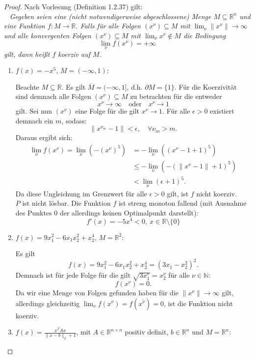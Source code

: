 \documentclass[12pt]{extreport} %
\newcommand{\N}{\mathbb{N}}
\newcommand{\R}{\mathbb{R}}
\theoremstyle{named}
\theoremstyle{nnamed}
\theoremstyle{itshape}
\theoremstyle{normal}
\begin{document}
\begin{proof} Nach Vorlesung (Definition 1.2.37) gilt: ~\\ ~\medskip
	\textit{Gegeben seien eine (nicht notwendigerweise abgeschlossene) Menge $M \subseteq \R^n$ und eine Funktion $f \colon M \rightarrow \R$. Falls für alle Folgen $(x^\nu) \subseteq M$ mit $\lim_{\nu} \| x^\nu \| \rightarrow \infty$ und alle konvergenten Folgen $(x^\nu) \subseteq M$ mit $\lim_{\nu} x^\nu \notin M$ die Bedingung}
	$$ \lim_{\nu} f(x^\nu) = + \infty $$
	\textit{gilt, dann heißt $f$ koerziv auf $M$.} ~\\
	
	\begin{enumerate} %
		\item $f(x) = - x^5$, $M =(- \infty, 1)$: ~\medskip
		
			Beachte $M \subseteq \R$. Es gilt $\overline{M} = (-\infty, 1]$, d.h. $\partial M = \{ 1 \}$. Für die Koerzivität sind demnach alle Folgen $\left( x^\nu \right) \subseteq M$ zu betrachten für die entweder
			$$ x^\nu \longrightarrow \infty \quad \text{oder} \quad x^\nu \longrightarrow 1 $$
			gilt. Sei nun $(x^\nu)$ eine Folge für die gilt $x^\nu \rightarrow 1$. Für alle $\epsilon > 0$ existiert demnach ein $m$, sodass:
			$$ \| x^{\nu_m} - 1 \| < \epsilon, \quad \forall \nu_m > m. $$
			Daraus ergibt sich:
			\begin{align*}
				 \lim_\nu f(x^\nu) = \lim_\nu \left( - \left(x^\nu \right)^5 \right) & = -  \lim_\nu \left( \left(x^\nu - 1 + 1 \right)^5 \right) \\
				 	& \leq - \lim_\nu  \left( - \left( \| x^\nu -1 \| + 1 \right)^5 \right) \\
				 	& < \lim_\nu  \left( \epsilon + 1 \right)^5.  
			\end{align*}
			Da diese Ungleichung im Grenzwert für alle $\epsilon > 0$ gilt, ist $f$ nicht koerziv. ~\\ 
			
			$P$ ist nicht lösbar. Die Funktion $f$ ist streng monoton fallend (mit Ausnahme des Punktes 0 der allerdings keinen Optimalpunkt darstellt):
			$$ f'(x) = -5 x^4 < 0, ~ x \in \R \setminus \{ 0 \} $$
		\item  $f(x) = 9 x_1^2 - 6 x_1 x_2^2 + x_2^4$, $M = \R^2$: ~\medskip
		
			Es gilt
			$$ f(x) = 9 x_1^2 - 6 x_1 x_2^2 + x_2^4 = (3 x_1 - x_2^2)^2. $$
			Demnach ist für jede Folge für die gilt $\sqrt{3 x^\nu_1} = x^\nu_2$ für alle $\nu \in \N$:
			$$ f(x^\nu) = 0. $$
			Da wir eine Menge von Folgen gefunden haben für die $\| x^\nu \| \rightarrow \infty$ gilt, allerdings gleichzeitig $\lim_{\nu} f(x^\nu) = f(x^{\tilde{\nu}}) = 0$, ist die Funktion nicht koerziv. ~\\ 
		\item $f(x) = \frac{x^T A x}{\| x - b\|_2 + 1}$, mit $A \in \R^{n \times n}$ positiv definit, $b \in \R^n$ und $M = \R^n$: ~\medskip
		

\end{enumerate}
\end{proof}
\end{document}
